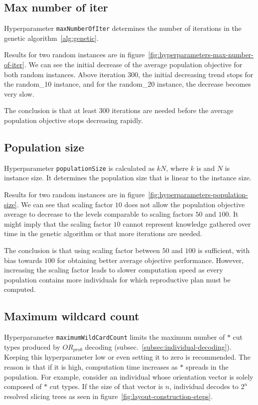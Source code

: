 \newpage
\subsection{Max number of iter}\label{subsec:max-number-of-iter}
Hyperparameter \verb|maxNumberOfIter| determines the number of iterations in the genetic algorithm~\ref{alg:genetic}.

Results for two random instances are in figure~\ref{fig:hyperparameters-max-number-of-iter}.
We can see the initial decrease of the average population objective for both random instances.
Above iteration 300, the initial decreasing trend stops for the random\_10 instance, and for the random\_20 instance, the decrease becomes very slow.

The conclusion is that at least 300 iterations are needed before the average population objective
stops decreasing rapidly.

\subsection{Population size}\label{subsec:population-size}

Hyperparameter \verb|populationSize| is calculated as $kN$, where $k$ is 
and $N$ is instance size.
It determines the population size that is linear to the instance size.

Results for two random instances are in figure~\ref{fig:hyperparameters-population-size}.
We can see that scaling factor $10$ does not allow
the population objective average to decrease to the levels comparable to scaling factors $50$ and $100$.
It might imply that the scaling factor $10$ cannot represent knowledge gathered over time
in the genetic algorithm or that more iterations are needed.

The conclusion is that using scaling factor between $50$ and $100$ is sufficient, with bias towards $100$
for obtaining better average objective performance.
However, increasing the scaling factor leads to slower computation speed as every population contains
more individuals for which reproductive plan must be computed.

\subsection{Maximum wildcard count}\label{subsec:maximum-wild-card-count}
Hyperparameter \verb|maximumWildCardCount| limits the maximum number of $*$ cut types produced by $OR_{prob}$ decoding (subsec.~\ref{subsec:individual-decoding}).
Keeping this hyperparameter low or even setting it to zero is recommended.
The reason is that if it is high, computation time increases as $*$ spreads in the population.
For example, consider an individual whose orientation vector is solely composed of $*$ cut types.
If the size of that vector is $n$, individual decodes to $2^n$ resolved slicing trees as seen in figure~\ref{fig:layout-construction-steps}.


